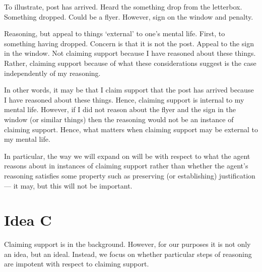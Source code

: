\begin{note}[Illustration of I/E]
  To illustrate, post has arrived.
  Heard the something drop from the letterbox.
  Something dropped.
  Could be a flyer.
  However, sign on the window and penalty.

  Reasoning, but appeal to things `external' to one's mental life.
  First, to something having dropped.
  Concern is that it is not the post.
  Appeal to the sign in the window.
  Not claiming support because I have reasoned about these things.
  Rather, claiming support because of what these considerations suggest is the case independently of my reasoning.

  In other words, it may be that I claim support that the post has arrived because I have reasoned about these things.
  Hence, claiming support is internal to my mental life.
  However, if I did not reason about the flyer and the sign in the window (or similar things) then the reasoning would not be an instance of claiming support.
  Hence, what matters when claiming support may be external to my mental life.
\end{note}

\begin{note}
  In particular, the way we will expand on \ideaCSB{} will be with respect to what the agent reasons about in instances of claiming support rather than whether the agent's reasoning satisfies some property such as preserving (or establishing) justification --- it may, but this will not be important.
\end{note}

\section{Idea C}
\label{sec:claim-supp-impot}

\begin{note}
  Claiming support is in the background.
  However, for our purposes it is not only an idea, but an ideal.
  Instead, we focus on whether particular steps of reasoning are impotent with respect to claiming support.
\end{note}

